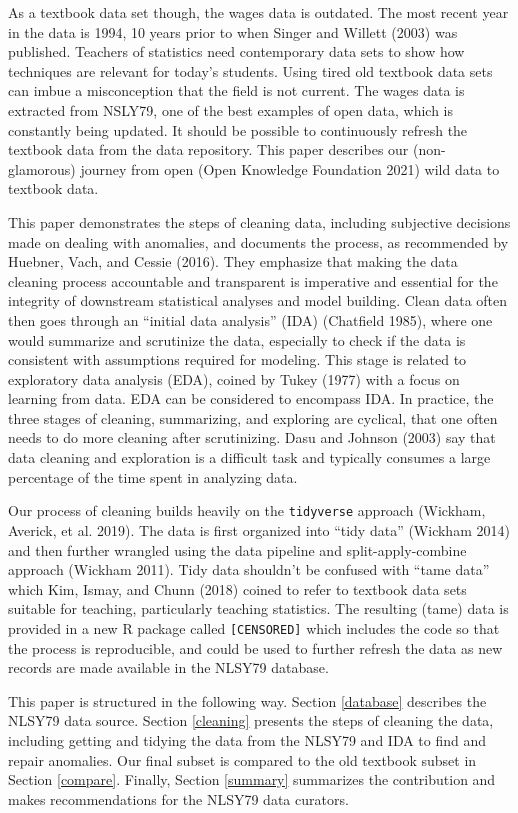 \documentclass{article}
\begin{document}
As a textbook data set though, the wages data is outdated. The most recent year in the data is 1994, 10 years prior to when Singer and Willett (2003) was published. Teachers of statistics need contemporary data sets to show how techniques are relevant for today's students. Using tired old textbook data sets can imbue a misconception that the field is not current. The wages data is extracted from NSLY79, one of the best examples of open data, which is constantly being updated. It should be possible to continuously refresh the textbook data from the data repository. This paper describes our (non-glamorous) journey from open (Open Knowledge Foundation 2021) wild data to textbook data.

This paper demonstrates the steps of cleaning data, including subjective decisions made on dealing with anomalies, and documents the process, as recommended by Huebner, Vach, and Cessie (2016). They emphasize that making the data cleaning process accountable and transparent is imperative and essential for the integrity of downstream statistical analyses and model building. Clean data often then goes through an ``initial data analysis'' (IDA) (Chatfield 1985), where one would summarize and scrutinize the data, especially to check if the data is consistent with assumptions required for modeling. This stage is related to exploratory data analysis (EDA), coined by Tukey (1977) with a focus on learning from data. EDA can be considered to encompass IDA. In practice, the three stages of cleaning, summarizing, and exploring are cyclical, that one often needs to do more cleaning after scrutinizing. Dasu and Johnson (2003) say that data cleaning and exploration is a difficult task and typically consumes a large percentage of the time spent in analyzing data.

Our process of cleaning builds heavily on the \texttt{tidyverse} approach (Wickham, Averick, et al. 2019). The data is first organized into ``tidy data'' (Wickham 2014) and then further wrangled using the data pipeline and split-apply-combine approach (Wickham 2011). Tidy data shouldn't be confused with ``tame data'' which Kim, Ismay, and Chunn (2018) coined to refer to textbook data sets suitable for teaching, particularly teaching statistics. The resulting (tame) data is provided in a new R package called \texttt{[CENSORED]} which includes the code so that the process is reproducible, and could be used to further refresh the data as new records are made available in the NLSY79 database.

This paper is structured in the following way. Section \ref{database} describes the NLSY79 data source. Section \ref{cleaning} presents the steps of cleaning the data, including getting and tidying the data from the NLSY79 and IDA to find and repair anomalies. Our final subset is compared to the old textbook subset in Section \ref{compare}. Finally, Section \ref{summary} summarizes the contribution and makes recommendations for the NLSY79 data curators.
\end{document}
